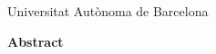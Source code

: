 \documentclass[a4paper,11pt,english,oneside,onecolumn,final,openany]{report}
\begin{document}
\vfill{}
{\par\centering Universitat Autònoma de Barcelona \par}


\newpage
\pagestyle{empty}
\begin{center}
\vspace*{3.5cm}
{\LARGE \bfseries  Abstract}
\end{center}
\vspace{0.5cm}
\begin{center} 
\begin{minipage}{5.5in}
\begin{center} \vrule width 4.5in height 0.4pt \end{center} 
\parindent=0pt 

\begin{center} \vrule width 4.5in height 0.4pt \end{center} 
\end{minipage} 
\end{center}



\tableofcontents

%

\newpage
{}
\pagestyle{fancy}







%
%

%

%


{\footnotesize


}
\end{document}
